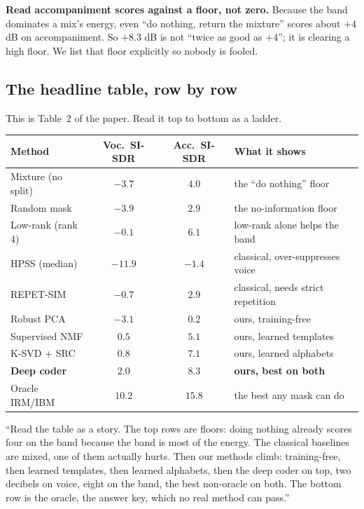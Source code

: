 \documentclass[11pt]{article}
\begin{document}
\begin{keypoint}
\textbf{Read accompaniment scores against a floor, not zero.} Because the band
dominates a mix's energy, even ``do nothing, return the mixture'' scores about
$+4$ dB on accompaniment. So $+8.3$ dB is not ``twice as good as $+4$''; it is
clearing a high floor. We list that floor explicitly so nobody is fooled.
\end{keypoint}

\subsection{The headline table, row by row}
This is Table~2 of the paper. Read it top to bottom as a ladder.

\begin{center}\small
\begin{tabular}{@{}lccl@{}}
\toprule
\textbf{Method} & \textbf{Voc.\ SI-SDR} & \textbf{Acc.\ SI-SDR} & \textbf{What it shows} \\
\midrule
Mixture (no split) & $-3.7$ & $4.0$ & the ``do nothing'' floor \\
Random mask        & $-3.9$ & $2.9$ & the no-information floor \\
Low-rank (rank 4)  & $-0.1$ & $6.1$ & low-rank alone helps the band \\
HPSS (median)      & $-11.9$& $-1.4$& classical, over-suppresses voice \\
REPET-SIM          & $-0.7$ & $2.9$ & classical, needs strict repetition \\
Robust PCA         & $-3.1$ & $0.2$ & ours, training-free \\
Supervised NMF     & $0.5$  & $5.1$ & ours, learned templates \\
K-SVD + SRC        & $0.8$  & $7.1$ & ours, learned alphabets \\
\textbf{Deep coder}& $\bm{2.0}$ & $\bm{8.3}$ & \textbf{ours, best on both} \\
Oracle IRM/IBM     & $10.2$ & $15.8$ & the best any mask can do \\
\bottomrule
\end{tabular}
\end{center}

\begin{saythis}
``Read the table as a story. The top rows are floors: doing nothing already scores
four on the band because the band is most of the energy. The classical baselines
are mixed, one of them actually hurts. Then our methods climb: training-free,
then learned templates, then learned alphabets, then the deep coder on top, two
decibels on voice, eight on the band, the best non-oracle on both. The bottom row
is the oracle, the answer key, which no real method can pass.''
\end{saythis}
\end{document}
